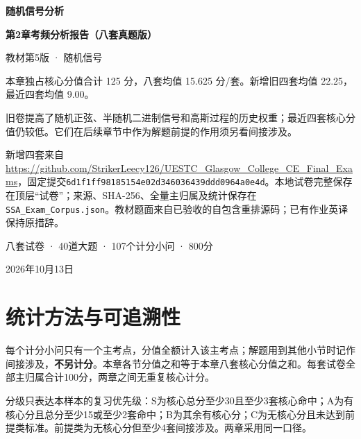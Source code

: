 \documentclass[11pt,fontset=fandol]{ctexart}
\begin{document}
\begin{titlepage}\centering\vspace*{2cm}

{\Huge\bfseries 随机信号分析}\par\vspace{1cm}

{\LARGE\bfseries 第2章考频分析报告（八套真题版）}\par\vspace{1cm}

{\large 教材第5版 · 随机信号}\par\vspace{1cm}

\begin{keybox}[title=样本扩充后的结论]

本章独占核心分值合计 125 分，八套均值 15.625 分/套。新增旧四套均值 22.25，最近四套均值 9.00。

旧卷提高了随机正弦、半随机二进制信号和高斯过程的历史权重；最近四套核心分值仍较低。它们在后续章节中作为解题前提的作用须另看间接涉及。

\end{keybox}\par\bigskip\begin{minipage}{\textwidth}\small\RaggedRight 新增四套来自\url{https://github.com/StrikerLeecy126/UESTC_Glasgow_College_CE_Final_Exams}，固定提交\texttt{6d1f1ff98185154e02d346036439ddd0964a0e4d}。本地试卷完整保存在顶层“试卷”；来源、SHA-256、全量主归属及统计保存在\texttt{SSA\_Exam\_Corpus.json}。教材题面来自已验收的自包含重排源码；已有作业英译保持原措辞。\end{minipage}\vfill 八套试卷 · 40道大题 · 107个计分小问 · 800分\par 2026年10月13日\end{titlepage}

\tableofcontents\clearpage

\section{统计方法与可追溯性}

每个计分小问只有一个主考点，分值全额计入该主考点；解题用到其他小节时记作间接涉及，\textbf{不另计分}。本章各节分值之和等于本章八套核心分值之和。每套试卷全部主归属合计100分，两章之间无重复核心计分。

分级只表达本样本的复习优先级：S为核心总分至少30且至少3套核心命中；A为有核心分且总分至少15或至少2套命中；B为其余有核心分；C为无核心分且未达到前提类标准。前提类为无核心分但至少4套间接涉及。两章采用同一口径。
\end{document}
